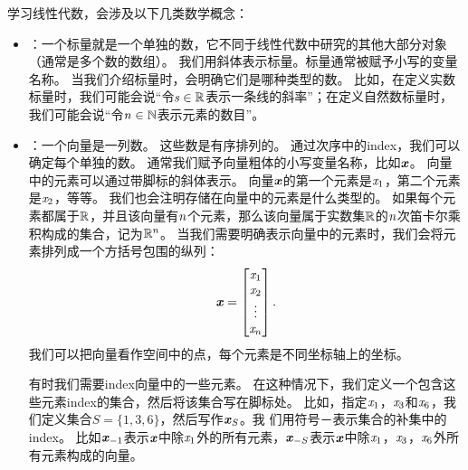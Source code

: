 学习线性代数，会涉及以下几类数学概念：
\begin{itemize}
    \item {}：一个标量就是一个单独的数，它不同于线性代数中研究的其他大部分对象（通常是多个数的数组）。
    我们用斜体表示标量。标量通常被赋予小写的变量名称。
    当我们介绍标量时，会明确它们是哪种类型的数。
    比如，在定义实数标量时，我们可能会说``令$\mathit{s} \in \mathbb{R}$表示一条线的斜率''；在定义自然数标量时，我们可能会说``令$\mathit{n}\in\mathbb{N}$表示元素的数目''。


    \item {}：一个向量是一列数。
    这些数是有序排列的。
    通过次序中的\gls{index}，我们可以确定每个单独的数。
    通常我们赋予向量粗体的小写变量名称，比如$\boldsymbol{\mathit{x}}$。
    向量中的元素可以通过带脚标的斜体表示。
    向量$\boldsymbol{\mathit{x}}$的第一个元素是$\mathit{x}_1$，第二个元素是$\mathit{x}_2$，等等。
    我们也会注明存储在向量中的元素是什么类型的。
    如果每个元素都属于$\mathbb{R}$，并且该向量有$\mathit{n}$个元素，那么该向量属于实数集$\mathbb{R}$的$\mathit{n}$次笛卡尔乘积构成的集合，记为$\mathbb{R}^n$。
    当我们需要明确表示向量中的元素时，我们会将元素排列成一个方括号包围的纵列：
    \begin{equation}
        \boldsymbol{\mathit{x}}=\begin{bmatrix} \mathit{x}_1   \\  
                            \mathit{x}_2   \\ 
                            \vdots  \\ 
                            \mathit{x}_n 
                \end{bmatrix}.
    \end{equation}
    我们可以把向量看作空间中的点，每个元素是不同坐标轴上的坐标。
    
    有时我们需要\gls{index}向量中的一些元素。
    在这种情况下，我们定义一个包含这些元素\gls{index}的集合，然后将该集合写在脚标处。
    比如，指定$\mathit{x}_1$，$\mathit{x}_3$和$\mathit{x}_6$，我们定义集合$S=\{1,3,6\}$，然后写作$\boldsymbol{\mathit{x}}_S$。我
    们用符号－表示集合的补集中的\gls{index}。
    比如$\boldsymbol{\mathit{x}}_{-1}$表示$\boldsymbol{\mathit{x}}$中除$\mathit{x}_1$外的所有元素，$\boldsymbol{\mathit{x}}_{-S}$表示$\boldsymbol{\mathit{x}}$中除$\mathit{x}_1$，$\mathit{x}_3$，$\mathit{x}_6$外所有元素构成的向量。


\end{itemize}
